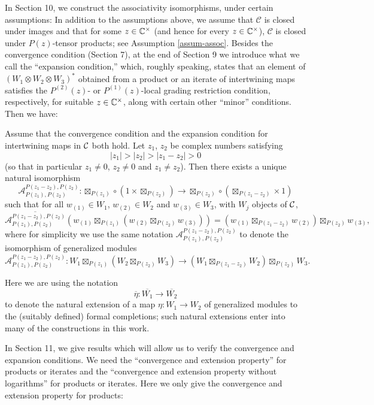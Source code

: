 \documentclass[12pt]{article}
\begin{document}
In Section 10, we construct the associativity isomorphisms, under
certain assumptions: In addition to the assumptions above, we assume
that $\mathcal{C}$ is closed under images and that for some $z\in
\mathbb{C}^{\times}$ (and hence for every $z\in \mathbb{C}^{\times}$), $\mathcal{C}$
is closed under $P(z)$-tensor products; see Assumption
\ref{assum-assoc}.  Besides the convergence condition (Section 7), at
the end of Section 9 we introduce what we call the ``expansion
condition,'' which, roughly speaking, states that an element of
$(W_{1}\otimes W_{2}\otimes W_{3})^{*}$ obtained from a product or an
iterate of intertwining maps satisfies the $P^{(2)}(z)$- or
$P^{(1)}(z)$-local grading restriction condition, respectively, for
suitable $z\in \mathbb{C}^{\times}$, along with certain other ``minor''
conditions. Then we have:

\setcounter{section}{10}
\setcounter{rema}{2}
\begin{theo}
Assume that the convergence condition and the expansion condition for
intertwining maps in ${\cal C}$ both hold.  Let $z_1$, $z_2$ be
complex numbers satisfying
\[
|z_1|>|z_2|>|z_1-z_{2}|>0
\]
(so that in particular $z_1\neq 0$, $z_2\neq 0$ and $z_1\neq z_2$).
Then there exists a unique natural isomorphism
\[
\mathcal{A}_{P(z_{1}), P(z_{2})}^{P(z_{1}-z_{2}), P(z_{2})}:
\boxtimes_{P(z_{1})}\circ (1 \times \boxtimes_{P(z_2)}) \to
\boxtimes_{P(z_2)}\circ (\boxtimes_{P(z_1-z_2)}\times 1)
\]
such that for all $w_{(1)}\in W_1$, $w_{(2)}\in W_2$ and
$w_{(3)}\in W_3$, with $W_j$ objects of ${\cal C}$,
\[
\overline{\mathcal{A}_{P(z_{1}), P(z_{2})}^{P(z_{1}-z_{2}), P(z_{2})}}
(w_{(1)}\boxtimes_{P(z_1)}
(w_{(2)}\boxtimes_{P(z_2)} w_{(3)})) = (w_{(1)}\boxtimes_{P(z_1-z_2)}
w_{(2)})\boxtimes_{P(z_2)} w_{(3)},
\]
where for simplicity we use the same notation $\mathcal{A}_{P(z_{1}),
P(z_{2})}^{P(z_{1}-z_{2}), P(z_{2})}$ to denote the isomorphism of
generalized modules
\[
\mathcal{A}_{P(z_{1}), P(z_{2})}^{P(z_{1}-z_{2}), P(z_{2})}:
W_1\boxtimes_{P(z_{1})}
(W_2\boxtimes_{P(z_2)} W_3) \longrightarrow (W_1\boxtimes_{P(z_1-z_2)}
W_2)\boxtimes_{P(z_2)} W_3.
\]
\end{theo}

Here we are using the notation
\[
\overline{\eta}:\overline{W_1} \to \overline{W_2}
\]
to denote the natural extension of a map $\eta:W_1 \to W_2$ of
generalized modules to the (suitably defined) formal completions; such
natural extensions enter into many of the constructions in this work.

In Section 11, we give results which will allow us to verify the
convergence and expansion conditions. We need the ``convergence and
extension property'' for products or iterates and the ``convergence
and extension property without logarithms'' for products or
iterates. Here we only give the convergence and extension property for
products:
\end{document}
